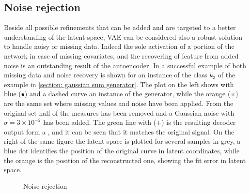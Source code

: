 \subsection{Noise rejection}
Beside all possible refinements that can be added and are targeted to a better understanding of the latent space, \acs{VAE} can be considered also a robust solution to handle noisy or missing data. Indeed the sole activation of a portion of the network in case of missing covariates, and the recovering of feature from added noise is an outstanding result of the autoencoder. In \Figure{\ref{fig:step1_noise_rejection}} a successful example of both missing data and noise recovery is shown for an instance of the class $k_3$ of the example in \cref{section: gaussian sum generator}. The plot on the left shows with blue ($\bullet$) and a dashed curve an instance of the generator, while the orange ($\times$) are the same set where missing values and noise have been applied. From the original set half of the measures has been removed and a Gaussian noise with $\sigma=3\times10^{-2}$ has been added. The green line with ($+$) is the resulting decoder output form a , and it can be seen that it matches the original signal. On the right of the same figure the latent space is plotted for several samples in grey, a blue dot identifies the position of the original curve in latent coordinates, while the orange is the position of the reconstructed one, showing the fit error in latent space.
\begin{figure}
    \centering
    \caption{ Noise rejection } 
    \label{fig:step1_noise}
\end{figure}
